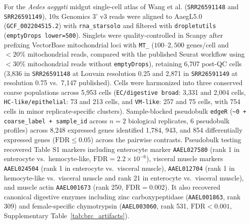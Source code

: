 \documentclass[11pt,letterpaper]{article}
\begin{document}
For the \textit{Aedes aegypti} midgut single-cell atlas of Wang et al. \cite{wang2024} (\texttt{SRR26591148} and \texttt{SRR26591149}), 10x Genomics 3' v3 reads were aligned to AaegL5.0 (\texttt{GCF\_002204515.2}) with \texttt{rna\_starsolo} and filtered with \texttt{dropletutils} (\texttt{emptyDrops lower=500}). Singlets were quality-controlled in Scanpy after prefixing VectorBase mitochondrial loci with \texttt{MT\_} ($100\text{--}2,500$ genes/cell and $< 20\%$ mitochondrial reads, compared with the published Seurat workflow using $< 30\%$ mitochondrial reads without \texttt{emptyDrops}), retaining 6,707 post-QC cells (3,836 in \texttt{SRR26591148} at Louvain resolution 0.25 and 2,871 in \texttt{SRR26591149} at resolution 0.75 vs.\ 7,147 published). Cells were harmonized into three conserved coarse populations across 5,953 cells (\texttt{EC/digestive broad}: 3,331 and 2,004 cells, \texttt{HC-like/epithelial}: 73 and 213 cells, and \texttt{VM-like}: 257 and 75 cells, with 754 cells in minor replicate-specific clusters). Sample-blocked pseudobulk \texttt{edgeR} (\texttt{\textasciitilde 0 + coarse\_label + sample\_id} across $n = 2$ biological replicates, 6 pseudobulk profiles) across 8,248 expressed genes identified 1,784, 943, and 854 differentially expressed genes ($\text{FDR} \le 0.05$) across the pairwise contrasts. Pseudobulk testing recovered Table S1 markers including enterocyte marker \texttt{AAEL027580} (rank 1 in enterocyte vs.\ hemocyte-like, $\text{FDR} = 2.2 \times 10^{-6}$), visceral muscle markers \texttt{AAEL024504} (rank 1 in enterocyte vs.\ visceral muscle), \texttt{AAEL012704} (rank 1 in hemocyte-like vs.\ visceral muscle and rank 21 in enterocyte vs.\ visceral muscle), and muscle actin \texttt{AAEL001673} (rank 250, $\text{FDR} = 0.002$). It also recovered canonical digestive enzymes including zinc carboxypeptidase (\texttt{AAEL001863}, rank 309) and female-specific chymotrypsin (\texttt{AAEL003060}, rank 531, $\text{FDR} < 0.001$, Supplementary Table~\ref{tab:brc_artifacts}).
\end{document}
